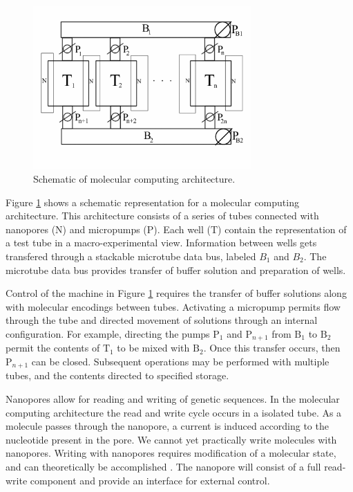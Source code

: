 \begin{figure}[htbp]
\begin{center}

	\includegraphics[width=0.7434\textwidth]{figures/molecularSchematic.png}

\caption{Schematic of molecular computing architecture.}
\label{molecularSchematic}
\end{center}
\end{figure}

\FloatBarrier	
	
Figure \ref{molecularSchematic} shows a schematic representation for a molecular computing architecture.  This architecture consists of a series of tubes connected with nanopores ($\text{N}$) and micropumps ($\text{P}$).  Each well ($\text{T}$) contain the representation of a test tube in a macro-experimental view.  Information between wells gets transfered through a stackable microtube data bus, labeled $B_1$ and $B_2$.  The microtube data bus provides transfer of buffer solution and preparation of wells.  

Control of the machine in Figure \ref{molecularSchematic} requires the transfer of buffer solutions along with molecular encodings between tubes.  Activating a micropump permits flow through the tube and directed movement of solutions through an internal configuration.  For example, directing the pumps $\text{P}_1$ and $\text{P}_{n+1}$ from $\text{B}_1$ to $\text{B}_2$ permit the contents of $\text{T}_1$ to be mixed with $\text{B}_2$.  Once this transfer occurs, then $\text{P}_{n+1}$ can be closed.  Subsequent operations may be performed with multiple tubes, and the contents directed to specified storage.  

Nanopores allow for reading and writing of genetic sequences.  In the molecular computing architecture the read and write cycle occurs in a isolated tube.  As a molecule passes through the nanopore, a current is induced according to the nucleotide present in the pore.  We cannot yet practically write molecules with nanopores.  Writing with nanopores requires modification of a molecular state, and can theoretically be accomplished \cite{dnaTransistorIBMpressrelease}.  The nanopore will consist of a full read-write component and provide an interface for external control.

